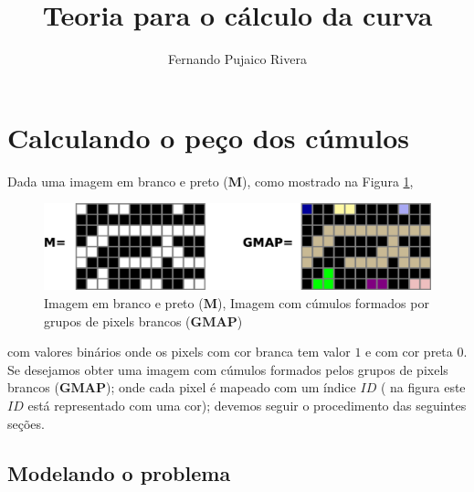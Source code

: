 \documentclass[a4paper,10pt]{article}
\title{Teoria para o cálculo da curva}
\author{Fernando Pujaico Rivera}
\begin{document}
\maketitle

\begin{abstract}

\end{abstract}


\section{Calculando o peço dos cúmulos}
\label{sec:cumulos}
Dada uma imagem  em branco e preto ($\mathbf{M}$), como mostrado na
Figura \ref{fig:moticacion}, 
\begin{figure}[!htb]
\centering
\includegraphics[scale=0.33]{moticacion.eps}
\caption{Imagem em branco e preto ($\mathbf{M}$), Imagem com cúmulos formados 
por grupos de pixels brancos ($\mathbf{GMAP}$) }
\label{fig:moticacion}
\end{figure}
com valores binários 
onde os pixels com cor branca tem valor $1$ e com cor preta $0$. 
Se desejamos obter uma imagem com cúmulos formados pelos grupos de pixels brancos ($\mathbf{GMAP}$); onde 
cada pixel é mapeado com um índice $ID$ ( na figura este $ID$ está representado 
com uma cor); devemos seguir o procedimento das seguintes seções.

\subsection{Modelando o problema}
\label{subsec:part1}
\end{document}
